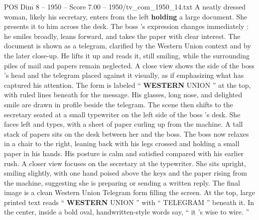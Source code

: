 \begin{textsample}{POS Dim 8 – 1950 – Score 7.00 – 1950/tv\_com\_1950\_14.txt}
A neatly dressed woman, likely his secretary, enters from the left \textbf{holding} a large document.
She presents it to him across the desk.
The boss ’s expression changes immediately : he smiles broadly, leans forward, and takes the paper with clear interest.
The document is shown as a telegram, clarified by the Western Union context and by the later close-up.
He lifts it up and reads it, still smiling, while the surrounding piles of mail and papers remain neglected.
A close view shows the side of the boss ’s head and the telegram placed against it visually, as if emphasizing what has captured his attention.
The form is labeled “ \textbf{WESTERN} UNION ” at the top, with ruled lines beneath for the message.
His glasses, long nose, and delighted smile are drawn in profile beside the telegram.
The scene then shifts to the secretary seated at a small typewriter on the left side of the boss ’s desk.
She faces left and types, with a sheet of paper curling up from the machine.
A tall stack of papers sits on the desk between her and the boss.
The boss now relaxes in a chair to the right, leaning back with his legs crossed and holding a small paper in his hands.
His posture is calm and satisfied compared with his earlier rush.
A closer view focuses on the secretary at the typewriter.
She sits upright, smiling slightly, with one hand poised above the keys and the paper rising from the machine, suggesting she is preparing or sending a written reply.
The final image is a clean Western Union Telegram form filling the screen.
At the top, large printed text reads “ \textbf{WESTERN} UNION ” with “ TELEGRAM ” beneath it.
In the center, inside a bold oval, handwritten-style words say, “ it ’s wise to wire. ”

\end{textsample}
